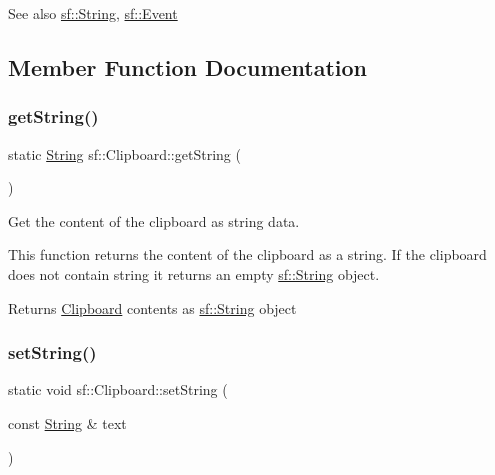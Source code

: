 \begin{DoxySeeAlso}{See also}
\mbox{\hyperlink{classsf_1_1_string}{sf\+::\+String}}, \mbox{\hyperlink{classsf_1_1_event}{sf\+::\+Event}} \begin{DoxyVerb}\end{DoxyVerb}
 
\end{DoxySeeAlso}


\subsection{Member Function Documentation}
\mbox{\label{classsf_1_1_clipboard_a3c385cc2b6d78a3d0cfa29928a7d6eb8}} 
\subsubsection{\texorpdfstring{getString()}{getString()}}
{\footnotesize\ttfamily static \mbox{\hyperlink{classsf_1_1_string}{String}} sf\+::\+Clipboard\+::get\+String (\begin{DoxyParamCaption}{ }\end{DoxyParamCaption})\hspace{0.3cm}{\ttfamily [static]}}



Get the content of the clipboard as string data. 

This function returns the content of the clipboard as a string. If the clipboard does not contain string it returns an empty \mbox{\hyperlink{classsf_1_1_string}{sf\+::\+String}} object.

\begin{DoxyReturn}{Returns}
\mbox{\hyperlink{classsf_1_1_clipboard}{Clipboard}} contents as \mbox{\hyperlink{classsf_1_1_string}{sf\+::\+String}} object \begin{DoxyVerb}\end{DoxyVerb}
 
\end{DoxyReturn}
\mbox{\label{classsf_1_1_clipboard_a29c597c2165d3ca3a89c17f31ff7413d}} 
\subsubsection{\texorpdfstring{setString()}{setString()}}
{\footnotesize\ttfamily static void sf\+::\+Clipboard\+::set\+String (\begin{DoxyParamCaption}\item[{const \mbox{\hyperlink{classsf_1_1_string}{String}} \&}]{text }\end{DoxyParamCaption})\hspace{0.3cm}{\ttfamily [static]}}



